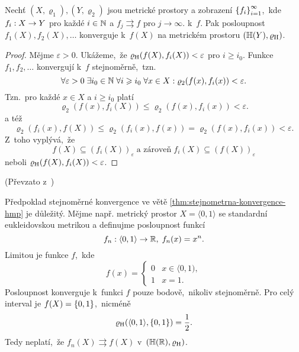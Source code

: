 \begin{theorem}\label{thm:stejnometrna-konvergence-hmp}
    Nechť $(X,\varrho_1),(Y,\varrho_2)$ jsou metrické prostory a zobrazení $\left\{f_i\right\}_{i=1}^\infty$,~kde $f_i:X \rightarrow Y$ pro každé $i\in\mathbb{N}$ a $f_j\rightrightarrows f$ pro $j\to\infty$. k~$f$. Pak posloupnost $f_1(X),f_2(X),\ldots$ konverguje k~$f(X)$ na metrickém prostoru $(\mathbb{H}(Y),\varrho_\textup{H})$.
\end{theorem}
\begin{proof}
    Mějme $\varepsilon>0$. Ukážeme,~že $\varrho_\textup{H}(f(X),f_i(X))<\varepsilon$ pro $i\geqslant i_0$. Funkce $f_1,f_2,\ldots$ konvergují k~$f$ stejnoměrně,~tzn.
    \[\forall\varepsilon>0\;\exists i_0\in\mathbb{N}\;\forall i\geqslant i_0\;\forall x\in X:\varrho_2(f(x),f_i(x))<\varepsilon.\]
    Tzn.~pro každé $x\in X$ a $i\geqslant i_0$ platí
    \[\varrho_2(f(x),f_i(X))\leqslant\varrho_2(f(x),f_i(x))<\varepsilon.\]
    a též
    \[\varrho_2(f_i(x),f(X))\leqslant\varrho_2(f_i(x),f(x))=\varrho_2(f(x),f_i(x))<\varepsilon.\]
    Z~toho vyplývá,~že
    \[f(X)\subseteq (f_i(X))_\varepsilon\;\text{a zároveň}\;f_i(X)\subseteq (f(X))_\varepsilon\]
    neboli $\varrho_\textup{H}(f(X),f_i(X))<\varepsilon$.
\end{proof}
(Převzato z~\citep[str. 74]{Edgar2008})
\begin{remark}
    Předpoklad stejnoměrné konvergence ve větě \ref{thm:stejnometrna-konvergence-hmp} je důležitý. Mějme např. metrický prostor $X=\langle0,1\rangle$ se standardní eukleidovskou metrikou a definujme posloupnost funkcí
    \[f_n:\langle0,1\rangle \rightarrow \mathbb{R},\;f_n(x)=x^n.\]
    Limitou je funkce $f$,~kde
    \[f(x) = \begin{cases}
        0 & x \in \langle0,1),\\
        1 & x = 1.
        \end{cases}\]
    Posloupnost konverguje k~funkci $f$ pouze bodově,~nikoliv stejnoměrně. Pro celý interval je $f(X)=\left\{0,1\right\}$,~nicméně
    \[\varrho_\textup{H}(\langle0,1\rangle,\left\{0,1\right\})=\dfrac{1}{2}.\]
    Tedy neplatí,~že $f_n(X)\rightrightarrows f(X)$ v~$(\mathbb{H}(\mathbb{R}),\varrho_\textup{H})$.
\end{remark}